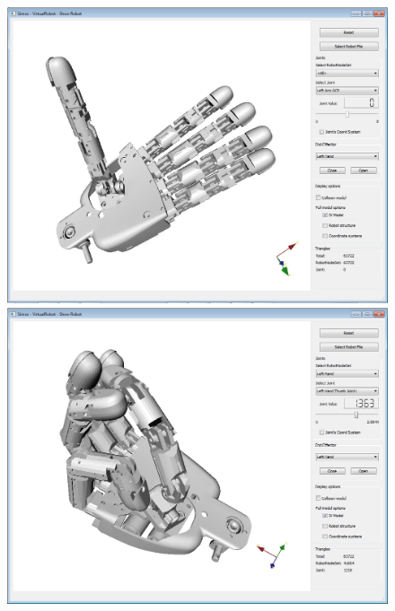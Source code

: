 \documentclass{book}
\begin{document}
\begin{figure}[H]
	\centering
	\begin{minipage} {.45\linewidth}
	  \includegraphics[width=\linewidth]{Tutorial9}
	\end{minipage}
	\begin{minipage} {.45\linewidth}
	  \includegraphics[width=\linewidth]{Tutorial9c}
	\end{minipage}	
\end{figure}	
\end{document}
